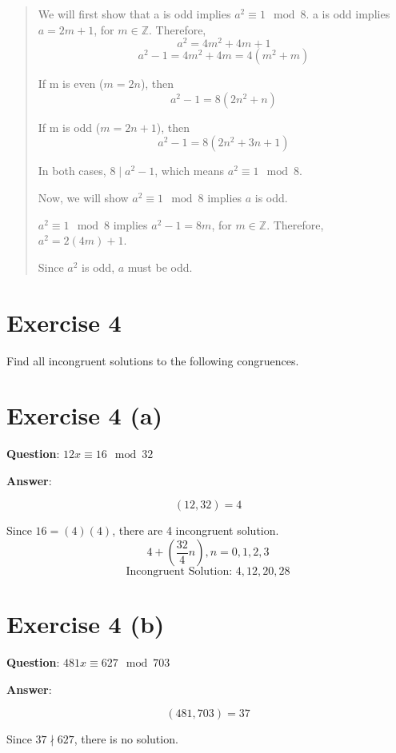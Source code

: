 \documentclass{article} %
\begin{document}
\begin{quote}
    We will first show that a is odd implies $a^2 \equiv 1 \mod 8$.
    a is odd implies $a = 2m + 1$, for $m \in \mathbb{Z}$. Therefore,
    \[a^2 = 4m^2 + 4m + 1\]
    \[a^2 - 1 = 4m^2 + 4m = 4(m^2 + m)\]

    If m is even ($m = 2n$), then
    \[a^2 - 1 = 8(2n^2 + n)\]

    If m is odd ($m = 2n + 1$), then
    \[a^2 - 1 = 8(2n^2 + 3n + 1)\]

    In both cases, $8 \mid a^2 - 1$, which means $a^2 \equiv 1 \mod 8$.

    Now, we will show $a^2 \equiv 1 \mod 8$ implies $a$ is odd.

    $a^2 \equiv 1 \mod 8$ implies $a^2 - 1 = 8m$, for $m \in \mathbb{Z}$. Therefore, $a^2 = 2 (4m) + 1$.

    Since $a^2$ is odd, $a$ must be odd.
\end{quote}

\section*{Exercise 4} Find all incongruent solutions to the following congruences.

\section*{Exercise 4 (a)}
\bigskip
\noindent
\textbf{Question}: $12x \equiv 16 \mod 32$

\bigskip
\noindent
\textbf{Answer}:
\begin{center}
    \[(12, 32) = 4\]

    Since $16 = (4)(4)$, there are 4 incongruent solution.
    \[4 + \left(\frac{32}{4}n\right), n = 0, 1, 2, 3\]
    \[\text{Incongruent Solution: }4, 12, 20, 28\]

\end{center}

\section*{Exercise 4 (b)}
\bigskip
\noindent
\textbf{Question}: $481x \equiv 627 \mod 703$

\bigskip
\noindent
\textbf{Answer}:
\begin{center}
    \[(481, 703) = 37\]

    Since $37 \nmid 627$, there is no solution.
\end{center}
\end{document}
